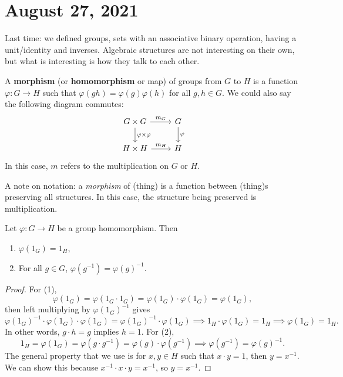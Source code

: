 \section{August 27, 2021}
Last time: we defined groups, sets with an associative binary operation, having a unit/identity and inverses. Algebraic structures are not interesting on their own, but what is interesting is how they talk to each other.

\begin{definition}[]
    A \textbf{morphism} (or \textbf{homomorphism} or map) of groups from $G$ to $H$ is a function $\varphi \colon G \to H$ such that $\varphi (gh)=\varphi (g)\varphi (h)$ for all $g,h \in G$. We could also say the following diagram commutes: \[
    \begin{tikzcd}
        G \times G \arrow[r, "m_G"]\arrow[d, "\varphi \times \varphi" ] & G\arrow[d, "\varphi" ]\\
        H\times H\arrow[r,"m_H"] & H
    \end{tikzcd}
    \] In this case, $m$ refers to the multiplication on $G$ or $H$.
\end{definition}
\begin{note}
    A note on notation: a \emph{morphism} of (thing) is a function between (thing)s preserving all structures. In this case, the structure being preserved is multiplication.
\end{note}

\begin{prop}
    Let $\varphi \colon G \to H$ be a group homomorphism. Then 
    \begin{enumerate}[label=(\arabic*)]
    \setlength\itemsep{-.2em}
\item $\varphi (1_G)=1_H$,
\item For all $g \in G$, $\varphi (g ^{-1})=\varphi (g) ^{-1}$.
    \end{enumerate}
\end{prop}
\begin{proof}
    For (1), \[
        \varphi (1_G )=\varphi (1_G \cdot 1_G)=\varphi (1_G )\cdot \varphi (1_G )=\varphi (1_G),
        \]then left multiplying by $\varphi (1_G)^{-1}$ gives \[
        \varphi (1_G)^{-1} \cdot \varphi (1_G) \cdot \varphi (1_G)=\varphi (1_G)^{-1}\cdot \varphi (1_G) \implies  1_H \cdot \varphi (1_G)=1_H \implies \varphi (1_G)=1_H.
    \] In other words, $g \cdot h=g$ implies $h=1$. For (2), \[
    1_H=\varphi (1_G)=\varphi (g \cdot g^{-1})=\varphi (g)\cdot \varphi (g^{-1})\implies \varphi (g^{-1})= \varphi (g )^{-1}.
    \] The general property that we use is for $x,y \in H$ such that $x \cdot y=1$, then $y=x ^{-1}$. We can show this because $x ^{-1} \cdot x \cdot y=x^{-1}$, so $y=x ^{-1}$.
\end{proof}

